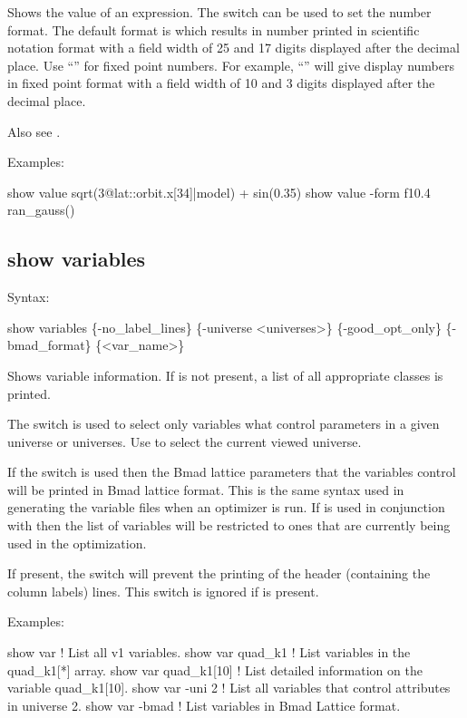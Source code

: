 {{{{{{{{{{Shows the value of an expression. The  switch can be used to set the number format.
The default format is  which results in number printed in scientific notation format
with a field width of 25 and 17 digits displayed after the decimal place. Use ``'' for fixed
point numbers. For example, ``'' will give display numbers in fixed point format with a
field width of 10 and 3 digits displayed after the decimal place.

Also see . 

Examples:
\begin{example}
  show value sqrt(3@lat::orbit.x[34]|model) + sin(0.35)
  show value -form f10.4 ran_gauss()
\end{example}



\subsection{show variables}
\label{s:show.variables}

Syntax:
\begin{example}
  show variables \{-no_label_lines\} \{-universe <universes>\}            
         \{-good_opt_only\} \{-bmad_format\} \{<var_name>\}
\end{example}


Shows variable information. If  is not present, a list of all appropriate 
classes is printed.

The  switch is used to select only variables what control parameters in a given
universe or universes. Use  to select the current viewed universe.

If the  switch is used then the Bmad lattice parameters that the \tao variables
control will be printed in Bmad lattice format. This is the same syntax used in generating the
variable files when an optimizer is run. If  is used in conjunction with
 then the list of variables will be restricted to ones that are currently being
used in the optimization.

If present, the  switch will prevent the printing of the header (containing the
column labels) lines. This switch is ignored if  is present.

Examples:
\begin{example}
  show var             ! List all v1 variables.
  show var quad_k1     ! List variables in the quad_k1[*] array.
  show var quad_k1[10] ! List detailed information on the variable quad_k1[10].
  show var -uni 2      ! List all variables that control attributes in universe 2.
  show var -bmad       ! List variables in Bmad Lattice format.
\end{example}

}}}}}}}}}}
